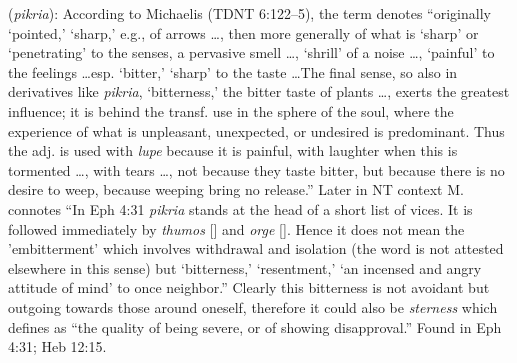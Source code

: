 \item[Bitterness,]

(\textit{pikria}):
According to Michaelis (TDNT 6:122--5), the term denotes ``originally `pointed,' `sharp,' e.g., of arrows \ldots, then more generally of what is `sharp' or `penetrating' to the senses, a pervasive smell \ldots, `shrill' of a noise \ldots, `painful' to the feelings \ldots esp. `bitter,' `sharp' to the taste \ldots The final sense, so also in derivatives like \emph{pikria}, `bitterness,' the bitter taste of plants \ldots, exerts the greatest influence; it is behind the transf. use in the sphere of the soul, where the experience of what is unpleasant, unexpected, or undesired is predominant. Thus the adj. is used with \emph{lupe} because it is painful, with laughter when this is tormented \ldots, with tears \ldots, not because they taste bitter, but because there is no desire to weep, because weeping bring no release.'' Later in NT context M. connotes ``In Eph 4:31 \emph{pikria} stands at the head of a short list of vices. It is followed immediately by \emph{thumos} [] and \emph{orge} []. Hence it does not mean the 'embitterment' which involves withdrawal and isolation (the word is not attested elsewhere in this sense) but `bitterness,' `resentment,' `an incensed and angry attitude of mind' to once neighbor.'' Clearly this bitterness is not avoidant but outgoing towards those around oneself, therefore it could also be \emph{sterness} which defines as ``the quality of being severe, or of showing disapproval.''
Found in Eph 4:31; Heb 12:15.
